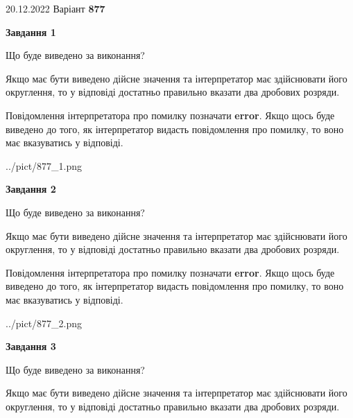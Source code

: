 \documentclass[12pt, ukrainian]{article}
\begin{document}
{20.12.2022 Варіант \No \textbf { 877 }\par}
{
\begin {Large}

{\begin {center}\textbf{Завдання 1}\end {center}}\par
Що буде виведено за виконання? \par

Якщо має бути виведено дійсне значення та інтерпретатор має здійснювати його округлення, 
то у відповіді достатньо правильно вказати два дробових розряди.

Повідомлення інтерпретатора про помилку позначати \textbf{error}.
Якщо щось буде виведено до того, як інтерпретатор видасть повідомлення про помилку, 
то воно має вказуватись у відповіді. \par

\begin{center}
	{../pict/877_1.png}
\end{center}
\newpage

{\begin {center}\textbf{Завдання 2}\end {center}}\par
Що буде виведено за виконання? \par

Якщо має бути виведено дійсне значення та інтерпретатор має здійснювати його округлення, 
то у відповіді достатньо правильно вказати два дробових розряди.

Повідомлення інтерпретатора про помилку позначати \textbf{error}.
Якщо щось буде виведено до того, як інтерпретатор видасть повідомлення про помилку, 
то воно має вказуватись у відповіді. \par

\begin{center}
	{../pict/877_2.png}
\end{center}
\newpage

{\begin {center}\textbf{Завдання 3}\end {center}}\par
Що буде виведено за виконання? \par

Якщо має бути виведено дійсне значення та інтерпретатор має здійснювати його округлення, 
то у відповіді достатньо правильно вказати два дробових розряди.


\end{Large}}
\end{document}
